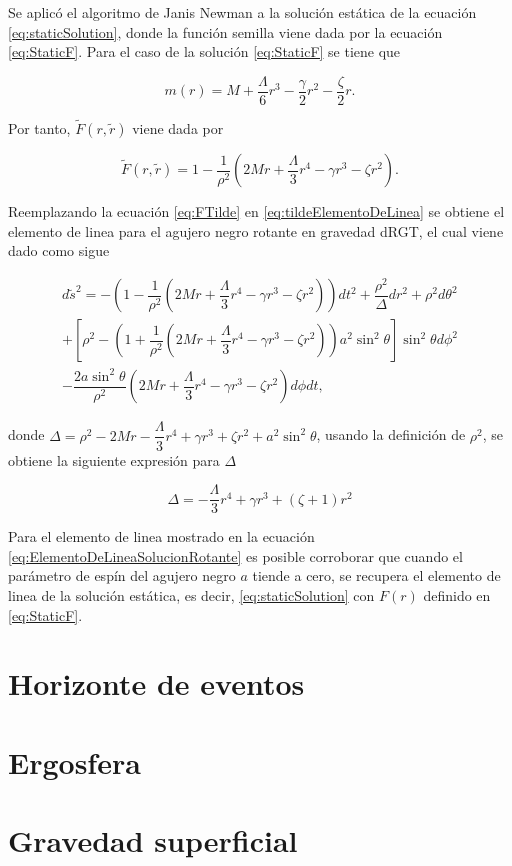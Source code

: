 Se aplicó el algoritmo de Janis Newman a la solución estática de la ecuación \eqref{eq:staticSolution}, donde la función semilla viene dada por la ecuación \eqref{eq:StaticF}. Para el caso de la solución \eqref{eq:StaticF} se tiene que

\begin{equation}
    m(r)=M+\dfrac{\Lambda}{6}r^3-\dfrac{\gamma}{2}r^2-\dfrac{\zeta}{2}r.
\end{equation}

Por tanto, $\tilde{F}(r,\tilde{r})$ viene dada por

\begin{equation}
    \tilde{F}(r,\tilde{r})=1-\dfrac{1}{\rho^2}\left(2Mr+\dfrac{\Lambda}{3}r^4-\gamma r^3-\zeta r^2\right).
    \label{eq:FTilde}
\end{equation}

Reemplazando la ecuación \eqref{eq:FTilde} en \eqref{eq:tildeElementoDeLinea} se obtiene el elemento de linea para el agujero negro rotante en gravedad dRGT, el cual viene dado como sigue

\begin{equation}
\begin{split}
    d\tilde{s}^2= -\left(1-\dfrac{1}{\rho^2}\left(2Mr+\dfrac{\Lambda}{3}r^4-\gamma r^3-\zeta r^2\right)\right)dt^2+\dfrac{\rho^2}{\Delta}dr^2+\rho^2d\theta^2\\
    +\left[\rho^2-\left(1+\dfrac{1}{\rho^2}\left(2Mr+\dfrac{\Lambda}{3}r^4-\gamma r^3-\zeta r^2\right)\right)a^2\sin^2\theta\right]\sin^2\theta d\phi^2\\
    -\dfrac{2a\sin^2\theta}{\rho^2}\left(2Mr+\dfrac{\Lambda}{3}r^4-\gamma r^3-\zeta r^2\right) d\phi dt,
\end{split}
        \label{eq:ElementoDeLineaSolucionRotante}
\end{equation}

donde $\Delta = \rho^2 - 2Mr - \dfrac{\Lambda}{3}r^4+\gamma r^3+\zeta r^2+a^2\sin^2\theta$, usando la definición de $\rho^2$, se obtiene la siguiente expresión para $\Delta$


\begin{equation}
    \Delta = -\dfrac{\Lambda}{3}r^4+\gamma r^3 + (\zeta+1)r^2
\end{equation}


Para el elemento de linea mostrado en la ecuación \eqref{eq:ElementoDeLineaSolucionRotante} es posible corroborar que cuando el parámetro de espín del agujero negro $a$ tiende a cero, se recupera el elemento de linea de la solución estática, es decir, \eqref{eq:staticSolution} con $F(r)$ definido en \eqref{eq:StaticF}.

\section{Horizonte de eventos}


\section{Ergosfera}


\section{Gravedad superficial}
